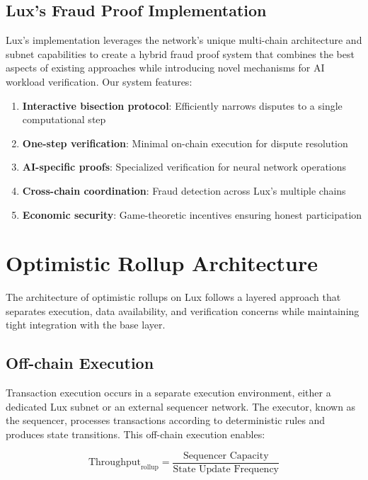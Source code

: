\documentclass[11pt,a4paper]{article}
\theoremstyle{definition}
\begin{document}
\subsection{Lux's Fraud Proof Implementation}

Lux's implementation leverages the network's unique multi-chain architecture and subnet capabilities to create a hybrid fraud proof system that combines the best aspects of existing approaches while introducing novel mechanisms for AI workload verification. Our system features:

\begin{enumerate}
    \item \textbf{Interactive bisection protocol}: Efficiently narrows disputes to a single computational step
    \item \textbf{One-step verification}: Minimal on-chain execution for dispute resolution
    \item \textbf{AI-specific proofs}: Specialized verification for neural network operations
    \item \textbf{Cross-chain coordination}: Fraud detection across Lux's multiple chains
    \item \textbf{Economic security}: Game-theoretic incentives ensuring honest participation
\end{enumerate}

\section{Optimistic Rollup Architecture}

The architecture of optimistic rollups on Lux follows a layered approach that separates execution, data availability, and verification concerns while maintaining tight integration with the base layer.

\subsection{Off-chain Execution}

Transaction execution occurs in a separate execution environment, either a dedicated Lux subnet or an external sequencer network. The executor, known as the sequencer, processes transactions according to deterministic rules and produces state transitions. This off-chain execution enables:

\begin{equation}
\text{Throughput}_{\text{rollup}} = \frac{\text{Sequencer Capacity}}{\text{State Update Frequency}}
\end{equation}
\end{document}
